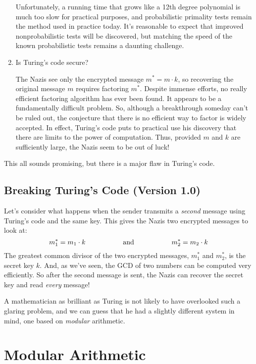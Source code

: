\begin{enumerate}
{Unfortunately, a running time that grows like a 12th degree polynomial
is much too slow for practical purposes, and probabilistic primality
tests remain the method used in practice today.  It's reasonable to
expect that improved nonprobabilistic tests will be discovered, but
matching the speed of the known probabilistic tests remains a daunting
challenge.  }

\item Is Turing's code secure?

The Nazis see only the encrypted message $m^* = m \cdot k$, so
recovering the original message $m$ requires factoring $m^*$.  Despite
immense efforts, no really efficient factoring algorithm has ever been
found.  It appears to be a fundamentally difficult problem.  So,
although a breakthrough someday can't be ruled out, the conjecture
that there is no efficient way to factor is widely accepted.  In
effect, Turing's code puts to practical use his discovery that there
are limits to the power of computation.  Thus, provided $m$ and $k$
are sufficiently large, the Nazis seem to be out of luck!

\end{enumerate}

This all sounds promising, but there is a major flaw in Turing's code.

\subsection{Breaking Turing's Code (Version 1.0)}

Let's consider what happens when the sender transmits a \emph{second}
message using Turing's code and the same key.  This gives the Nazis
two encrypted messages to look at:
\[
m_1^* = m_1 \cdot k
\hspace{0.75in} \text{and} \hspace{0.75in} m_2^* = m_2 \cdot k
\]
The greatest common divisor of the two encrypted messages, $m_1^*$ and
$m_2^*$, is the secret key $k$.  And, as we've seen, the GCD of two
numbers can be computed very efficiently.  So after the second message
is sent, the Nazis can recover the secret key and read \emph{every}
message!

A mathematician as brilliant as Turing is not likely to have
overlooked such a glaring problem, and we can guess that he had a
slightly different system in mind, one based on \emph{modular}
arithmetic.

\section{Modular Arithmetic}\label{modular_arithmeric_sec}

